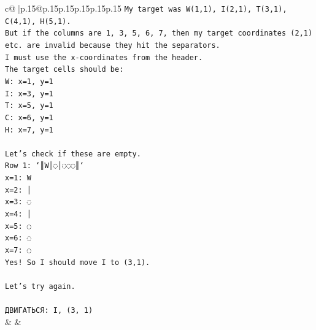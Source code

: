 \documentclass{article}
\begin{document}
{\begin{supertabular}{c@{$\;$}|p{.15\linewidth}@{}p{.15\linewidth}p{.15\linewidth}p{.15\linewidth}p{.15\linewidth}p{.15\linewidth}}
{{{\texttt{My target was W(1,1), I(2,1), T(3,1), C(4,1), H(5,1).} \\
\texttt{But if the columns are 1, 3, 5, 6, 7, then my target coordinates (2,1) etc. are invalid because they hit the separators.} \\
\texttt{I must use the x{-}coordinates from the header.} \\
\texttt{The target cells should be:} \\
\texttt{W: x=1, y=1} \\
\texttt{I: x=3, y=1} \\
\texttt{T: x=5, y=1} \\
\texttt{C: x=6, y=1} \\
\texttt{H: x=7, y=1} \\
\\ 
\texttt{Let's check if these are empty.} \\
\texttt{Row 1: `║W│◌│◌◌◌║`} \\
\texttt{x=1: W} \\
\texttt{x=2: │} \\
\texttt{x=3: ◌} \\
\texttt{x=4: │} \\
\texttt{x=5: ◌} \\
\texttt{x=6: ◌} \\
\texttt{x=7: ◌} \\
\texttt{Yes! So I should move I to (3,1).} \\
\\ 
\texttt{Let's try again.} \\
\\ 
\texttt{ДВИГАТЬСЯ: I, (3, 1)} \\
            }
        }
    }
    & & \\ \\


\end{supertabular}}
\end{document}
